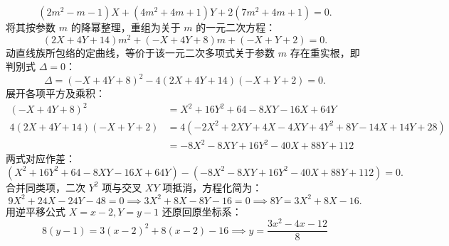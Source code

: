 \begin{solution}
\[ (2m^2 - m - 1)X + (4m^2 + 4m + 1)Y + 2(7m^2 + 4m + 1) = 0. \]
将其按参数 $m$ 的降幂整理，重组为关于 $m$ 的一元二次方程：
\[ (2X + 4Y + 14)m^2 + (-X + 4Y + 8)m + (-X + Y + 2) = 0. \]
动直线族所包络的定曲线，等价于该一元二次多项式关于参数 $m$ 存在重实根，即判别式 $\Delta = 0$：
\[ \Delta = (-X + 4Y + 8)^2 - 4(2X + 4Y + 14)(-X + Y + 2) = 0. \]
展开各项平方及乘积：
\begin{align*}
     (-X + 4Y + 8)^2 &= X^2 + 16Y^2 + 64 - 8XY - 16X + 64Y\\
     4(2X + 4Y + 14)(-X + Y + 2) &= 4(-2X^2 + 2XY + 4X - 4XY + 4Y^2 + 8Y - 14X + 14Y + 28) \\
     &= -8X^2 - 8XY + 16Y^2 - 40X + 88Y + 112
\end{align*}
两式对应作差：
\[ (X^2 + 16Y^2 + 64 - 8XY - 16X + 64Y) - (-8X^2 - 8XY + 16Y^2 - 40X + 88Y + 112) = 0. \]
合并同类项，二次 $Y^2$ 项与交叉 $XY$ 项抵消，方程化简为：
\[ 9X^2 + 24X - 24Y - 48 = 0\implies 3X^2 + 8X - 8Y - 16 = 0 \implies 8Y = 3X^2 + 8X - 16. \]
用逆平移公式 $X = x - 2, Y = y - 1$ 还原回原坐标系：
\[ 8(y - 1) = 3(x - 2)^2 + 8(x - 2) - 16\implies y = \frac{3x^2 - 4x - 12}{8} \]
\end{solution}


